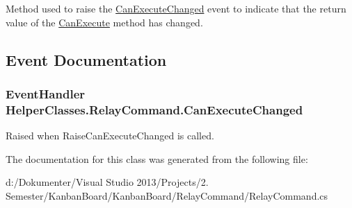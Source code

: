 Method used to raise the \hyperlink{class_helper_classes_1_1_relay_command_a2e0f01d199cf4ba351ba10aa7c9c85c4}{Can\+Execute\+Changed} event to indicate that the return value of the \hyperlink{class_helper_classes_1_1_relay_command_a1e2d080059a2f0f7cd455af612d77bbe}{Can\+Execute} method has changed. 



\subsection{Event Documentation}
\hypertarget{class_helper_classes_1_1_relay_command_a2e0f01d199cf4ba351ba10aa7c9c85c4}{}
\subsubsection[{Can\+Execute\+Changed}]{\setlength{\rightskip}{0pt plus 5cm}Event\+Handler Helper\+Classes.\+Relay\+Command.\+Can\+Execute\+Changed}\label{class_helper_classes_1_1_relay_command_a2e0f01d199cf4ba351ba10aa7c9c85c4}


Raised when Raise\+Can\+Execute\+Changed is called. 



The documentation for this class was generated from the following file\+:\begin{DoxyCompactItemize}
\item 
d\+:/\+Dokumenter/\+Visual Studio 2013/\+Projects/2. Semester/\+Kanban\+Board/\+Kanban\+Board/\+Relay\+Command/Relay\+Command.\+cs\end{DoxyCompactItemize}
